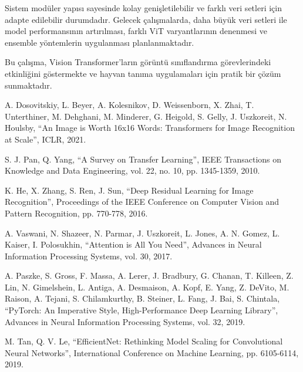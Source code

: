 \documentclass[conference, a4paper]{IEEEtran}
\begin{document}
	Sistem modüler yapısı sayesinde kolay genişletilebilir ve farklı veri setleri için adapte edilebilir durumdadır. Gelecek çalışmalarda, daha büyük veri setleri ile model performansının artırılması, farklı ViT varyantlarının denenmesi ve ensemble yöntemlerin uygulanması planlanmaktadır.
	
	Bu çalışma, Vision Transformer'ların görüntü sınıflandırma görevlerindeki etkinliğini göstermekte ve hayvan tanıma uygulamaları için pratik bir çözüm sunmaktadır.
	
	\begin{thebibliography}{1}
		A. Dosovitskiy, L. Beyer, A. Kolesnikov, D. Weissenborn, X. Zhai, T. Unterthiner, M. Dehghani, M. Minderer, G. Heigold, S. Gelly, J. Uszkoreit, N. Houlsby, ``An Image is Worth 16x16 Words: Transformers for Image Recognition at Scale'', ICLR, 2021.
		
		S. J. Pan, Q. Yang, ``A Survey on Transfer Learning'', IEEE Transactions on Knowledge and Data Engineering, vol. 22, no. 10, pp. 1345-1359, 2010.
		
		K. He, X. Zhang, S. Ren, J. Sun, ``Deep Residual Learning for Image Recognition'', Proceedings of the IEEE Conference on Computer Vision and Pattern Recognition, pp. 770-778, 2016.
		
		A. Vaswani, N. Shazeer, N. Parmar, J. Uszkoreit, L. Jones, A. N. Gomez, L. Kaiser, I. Polosukhin, ``Attention is All You Need'', Advances in Neural Information Processing Systems, vol. 30, 2017.
		
		A. Paszke, S. Gross, F. Massa, A. Lerer, J. Bradbury, G. Chanan, T. Killeen, Z. Lin, N. Gimelshein, L. Antiga, A. Desmaison, A. Kopf, E. Yang, Z. DeVito, M. Raison, A. Tejani, S. Chilamkurthy, B. Steiner, L. Fang, J. Bai, S. Chintala, ``PyTorch: An Imperative Style, High-Performance Deep Learning Library'', Advances in Neural Information Processing Systems, vol. 32, 2019.
		
		M. Tan, Q. V. Le, ``EfficientNet: Rethinking Model Scaling for Convolutional Neural Networks'', International Conference on Machine Learning, pp. 6105-6114, 2019.
	\end{thebibliography}
\end{document}
